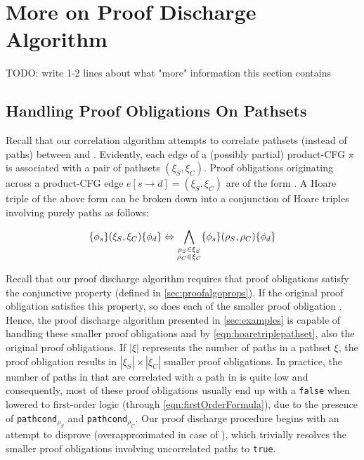 \section{More on Proof Discharge Algorithm}
\label{sec:proofalgo}
TODO: write 1-2 lines about what "more" information this section contains

\subsection{Handling Proof Obligations On Pathsets}
\label{sec:pathsethoaretriples}
Recall that our correlation algorithm attempts to correlate pathsets (instead of paths) between \sprog{} and \cprog{}.
Evidently, each edge of a (possibly partial) product-CFG $\pi$ is associated with a pair of pathsets $(\xi_S,\xi_C)$.
Proof obligations originating across a product-CFG edge $e[s \rightarrow d]=(\xi_S,\xi_C)$ are of
the form .
A Hoare triple of the above form can be broken down into a conjunction of Hoare triples involving purely paths as follows:

\begin{equation}
\label{eqn:hoaretriplepathset}
\{\phi_s\}(\xi_S,\xi_C)\{\phi_d\} \Leftrightarrow \bigwedge_{\substack{\rho_S \in \xi_S \\ \rho_C \in \xi_C}} \{\phi_s\}(\rho_S,\rho_C)\{\phi_d\}
\end{equation}

Recall that our proof discharge algorithm requires that proof obligations satisfy the conjunctive \recursiveRelation{} property (defined in \cref{sec:proofalgoprops}).
If the original proof obligation  satisfies this property, so does each of the smaller
proof obligation .
Hence, the proof discharge algorithm presented in \cref{sec:examples} is capable of handling these smaller proof obligations
and by \cref{eqn:hoaretriplepathset}, also the original proof obligations.
If $|\xi|$ represents the number of paths in a pathset $\xi$, the proof obligation  results
in $|\xi_S| \times |\xi_C|$ smaller proof obligations.
In practice, the number of paths in \sprog{} that are correlated with a path in \cprog{} is quite low
and consequently, most of these proof obligations usually end up with a {\tt false} \lhs{} when lowered to
first-order logic (through \cref{eqn:firstOrderFormula}), due to the presence of {\tt pathcond}$_{\rho_S}$ and {\tt pathcond}$_{\rho_C}$.
Our proof discharge procedure begins with an attempt to disprove \lhs{} (overapproximated in case of \recursiveRelations{}),
which trivially resolves the smaller proof obligations involving uncorrelated paths to {\tt true}.

